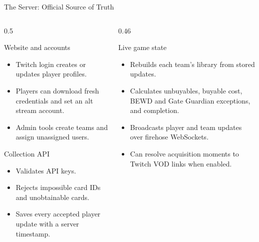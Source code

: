 \documentclass[aspectratio=169,11pt]{beamer}
\begin{document}
\begin{frame}{The Server: Official Source of Truth}
  \small
  \begin{columns}[T,onlytextwidth]
    \begin{column}{0.5\textwidth}
      \begin{block}{Website and accounts}
        \begin{itemize}
          \item Twitch login creates or updates player profiles.
          \item Players can download fresh credentials and set an alt stream account.
          \item Admin tools create teams and assign unassigned users.
        \end{itemize}
      \end{block}
      \begin{block}{Collection API}
        \begin{itemize}
          \item Validates API keys.
          \item Rejects impossible card IDs and unobtainable cards.
          \item Saves every accepted player update with a server timestamp.
        \end{itemize}
      \end{block}
    \end{column}
    \begin{column}{0.46\textwidth}
      \begin{block}{Live game state}
        \begin{itemize}
          \item Rebuilds each team's library from stored updates.
          \item Calculates unbuyables, buyable cost, BEWD and Gate Guardian exceptions, and completion.
          \item Broadcasts player and team updates over firehose WebSockets.
          \item Can resolve acquisition moments to Twitch VOD links when enabled.
        \end{itemize}
      \end{block}
    \end{column}
  \end{columns}
\end{frame}
\end{document}
